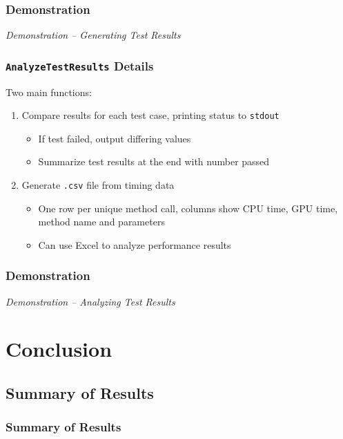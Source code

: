 \documentclass{beamer}
\begin{document}
\begin{frame}
\frametitle{Demonstration}
\begin{center}
\emph{Demonstration -- Generating Test Results}
\end{center}
\end{frame}

\begin{frame}
\frametitle{\texttt{AnalyzeTestResults} Details}
Two main functions:
\begin{enumerate}
\item Compare results for each test case, printing status to \texttt{stdout}
\begin{itemize}
\item If test failed, output differing values
\item Summarize test results at the end with number passed
\end{itemize}
\item Generate \texttt{.csv} file from timing data
\begin{itemize}
\item One row per unique method call, columns show CPU time, GPU time, method name and parameters
\item Can use Excel to analyze performance results
\end{itemize}
\end{enumerate}
\end{frame}

\begin{frame}
\frametitle{Demonstration}
\begin{center}
\emph{Demonstration -- Analyzing Test Results}
\end{center}
\end{frame}

\section{Conclusion}
\subsection{Summary of Results}
\begin{frame}
\frametitle{Summary of Results}
\end{frame}
\end{document}
